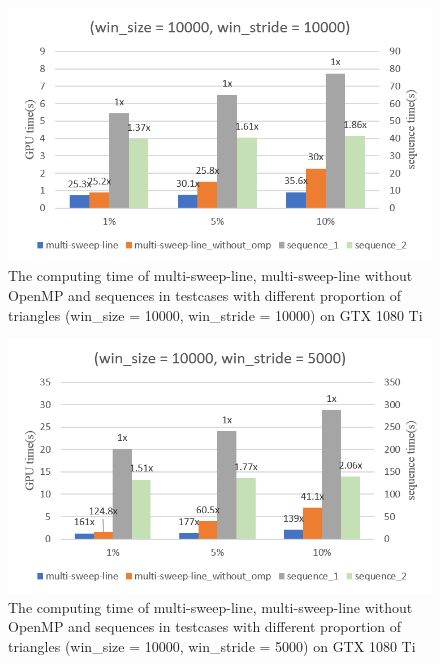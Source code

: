 \begin{figure}[!h]
    \centering
    \includegraphics[scale=0.7]{image/fig_5_13}
    \caption{The computing time of multi-sweep-line, multi-sweep-line without OpenMP and sequences in testcases with different proportion of triangles (win\_size = 10000, win\_stride = 10000) on GTX 1080 Ti}
    \label{fig:fig_5_13}
\end{figure}

\begin{figure}[!h]
    \centering
    \includegraphics[scale=0.7]{image/fig_5_14}
    \caption{The computing time of multi-sweep-line, multi-sweep-line without OpenMP and sequences in testcases with different proportion of triangles (win\_size = 10000, win\_stride = 5000) on GTX 1080 Ti}
    \label{fig:fig_5_14}
\end{figure}

